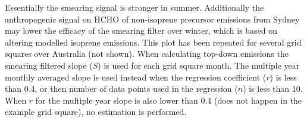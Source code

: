     Essentially the smearing signal is stronger in summer.
    Additionally the anthropogenic signal on HCHO of non-isoprene precursor emissions from Sydney may lower the efficacy of the smearing filter over winter, which is based on altering modelled isoprene emissions.
    This plot has been repeated for several grid squares over Australia (not shown).
    When calculating top-down emissions the smearing filtered slope ($S$) is used for each grid square month.
    The multiple year monthly averaged slope is used instead when the regression coefficient ($r$) is less than 0.4, or then number of data points used in the regression ($n$) is less than 10.
    When $r$ for the multiple year slope is also lower than 0.4 (does not happen in the example grid square), no estimation is performed.%
    
    
    
